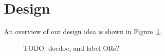 \section{Design}
An overview of our design idea is shown in Figure~\ref{fig:overview}.

\begin{figure}
	\centering
	
	\caption{%
		TODO: docdoc, and label ORs?
	}
	\label{fig:overview}
\end{figure}

%
%
%
